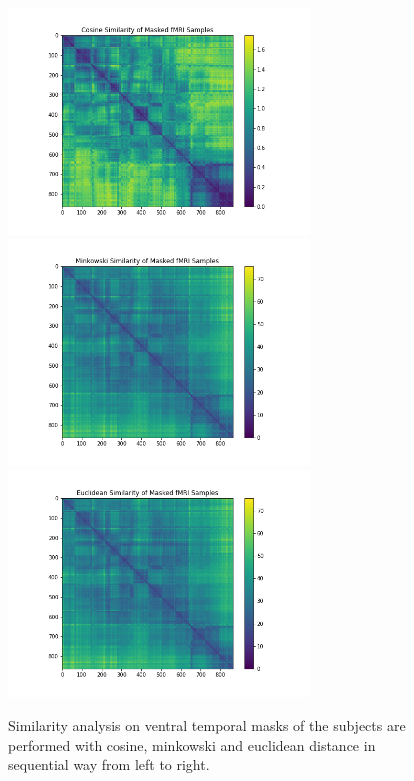 \documentclass[10pt, twocolumn, letterpaper]{article}
\begin{document}
\begin{figure}
     \includegraphics[width=.35\linewidth, height=6cm,  valign=c]{images/cosine.png}
    \includegraphics[width=.35\linewidth, height=6cm,  valign=c]{images/minkowski.png}
    \includegraphics[width=.35\linewidth, height=6cm,  valign=c]{images/euclidean.png}
    \caption{Similarity analysis on ventral temporal masks of the subjects are performed with cosine, minkowski and euclidean distance in sequential way from left to right.}\label{fig:sim}
\end{figure}
\end{document}
